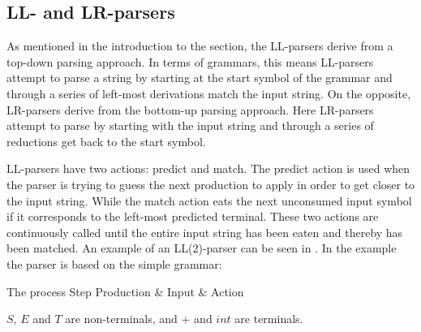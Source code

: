 \subsection{LL- and LR-parsers}
\label{subsec:llparsersandlrparsers}
As mentioned in the introduction to the section, the LL-parsers derive from a
top-down parsing approach. In terms of grammars, this means LL-parsers attempt
to parse a string by starting at the start symbol of the grammar and through a
series of left-most derivations match the input string. On the opposite,
LR-parsers derive from the bottom-up parsing approach. Here LR-parsers attempt
to parse by starting with the input string and through a series of reductions
get back to the start symbol.

LL-parsers have two actions: predict and match. The predict action is used when
the parser is trying to guess the next production to apply in order to get
closer to the input string. While the match action eats the next unconsumed
input symbol if it corresponds to the left-most predicted terminal. These two
actions are continuously called until the entire input string has been eaten and
thereby has been matched. An example of an LL($2$)-parser can be seen in
. In the example the parser is based on the simple grammar:

\begin{centering}
\begin{ebnf}
\end{ebnf}
\end{centering}

	      {The process                                          }
{Step  	 }{Production & Input       & Action                        }{
}

$S$, $E$ and $T$ are non-terminals, and $+$ and $int$ are terminals. 

